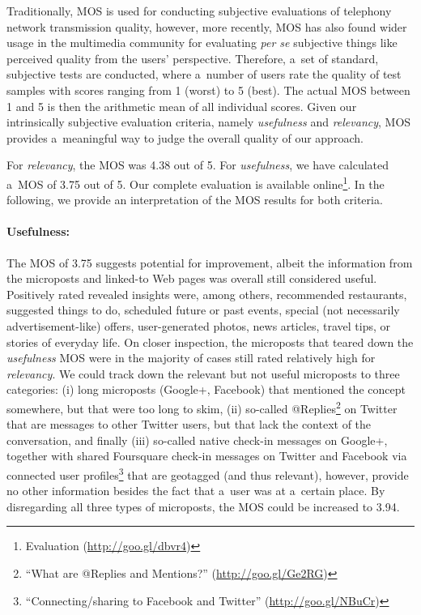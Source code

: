 \documentclass[runningheads,a4paper]{llncs}
\begin{document}
Traditionally, MOS is used for conducting subjective evaluations
of telephony network transmission quality,
however, more recently, MOS has also found wider usage in the multimedia community
for evaluating \emph{per se} subjective things
like perceived quality from the users' perspective. 
Therefore, a~set of standard, subjective tests are conducted,
where a~number of users rate the quality of test samples
with scores ranging from 1 (worst) to 5 (best).
The actual MOS between 1 and 5 is then the arithmetic mean of all individual scores.
Given our intrinsically subjective evaluation criteria,
namely \emph{usefulness} and \emph{relevancy},
MOS provides a~meaningful way to judge the overall quality of our approach.

For \emph{relevancy}, the MOS was 4.38 out of 5.
For \emph{usefulness}, we have calculated a~MOS of 3.75 out of 5.
Our complete evaluation is available online\footnote{Evaluation (\url{http://goo.gl/dbvr4})}.
In the following, we provide an interpretation of the MOS results for both criteria.

\paragraph{Usefulness:}
The MOS of 3.75 suggests potential for improvement,
albeit the information from the microposts and linked-to Web pages
was overall still considered useful.
Positively rated revealed insights were, among others, recommended restaurants,
suggested things to do, scheduled future or past events,
special (not necessarily advertisement-like) offers, user-generated photos,
news articles, travel tips, or stories of everyday life.
On closer inspection, the microposts that teared down the \emph{usefulness} MOS
were in the majority of cases still rated relatively high for \emph{relevancy}.
We could track down the relevant but not useful microposts to three categories:
(i) long microposts (Google+, Facebook) that mentioned the concept somewhere,
but that were too long to skim,
(ii) so-called
@Replies\footnote{``What are @Replies and Mentions?'' (\url{http://goo.gl/Ge2RG})}
on Twitter that are messages to other Twitter users,
but that lack the context of the conversation, and finally
(iii) so-called native check-in messages on Google+,
together with shared Foursquare check-in messages on Twitter and Facebook
via connected user profiles\footnote{``Connecting/sharing to Facebook and Twitter'' (\url{http://goo.gl/NBuCr})}
that are geotagged (and thus relevant), however,
provide no other information besides the fact that a~user was at a~certain place.
By disregarding all three types of microposts, the MOS could be increased to 3.94.
\end{document}
